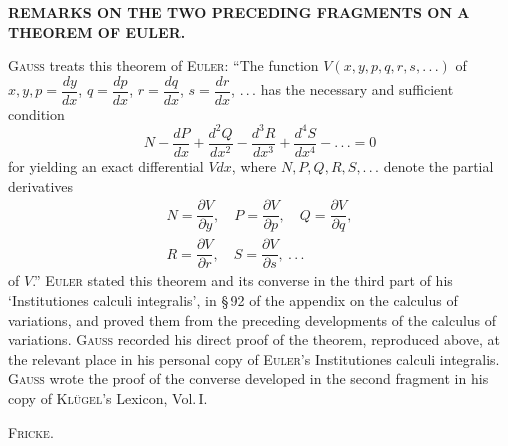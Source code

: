 \begin{center}
\textbf{REMARKS ON THE TWO PRECEDING FRAGMENTS ON A THEOREM OF EULER.}
\end{center}

\noindent\hspace*{\parindent}\textsc{Gauss} treats this theorem of \textsc{Euler}: “The function
$V(x, y, p, q, r, s, .\,.\,.)$ of $x, y, p=\dfrac{dy}{dx}$, $q=\dfrac{dp}{dx}$, $r=\dfrac{dq}{dx}$, $s=\dfrac{dr}{dx}$, $.\,.\,.$
has the necessary and sufficient condition
\[
N-\dfrac{dP}{dx}+\dfrac{d^2Q}{dx^2}-\dfrac{d^3R}{dx^3}+\dfrac{d^4S}{dx^4}-.\,.\,.=0
\]
for yielding an exact differential $Vdx$, where $N, P, Q, R, S, .\,.\,.$ denote the partial derivatives
\[
\begin{aligned}N=\dfrac{\partial V}{\partial y},\quad P=\dfrac{\partial V}{\partial p},\quad Q=\dfrac{\partial V}{\partial q},\\ R=\dfrac{\partial V}{\partial r},\quad S=\dfrac{\partial V}{\partial s},\ .\,.\,.
\end{aligned}
\]
of $V$.” \textsc{Euler} stated this theorem and its converse in the third part of his
‘Institutiones calculi integralis’, in \S\,92 of the appendix on the calculus of variations, and proved
them from the preceding developments of the calculus of variations.
\textsc{Gauss} recorded his direct proof of the theorem, reproduced above, at the relevant place
in his personal copy of \textsc{Euler}’s Institutiones calculi integralis. \textsc{Gauss} wrote
the proof of the converse developed in the second fragment in his copy of
\textsc{Klügel}’s Lexicon, Vol.\,I.

\begin{flushright}
\textsc{Fricke}.
\end{flushright}

